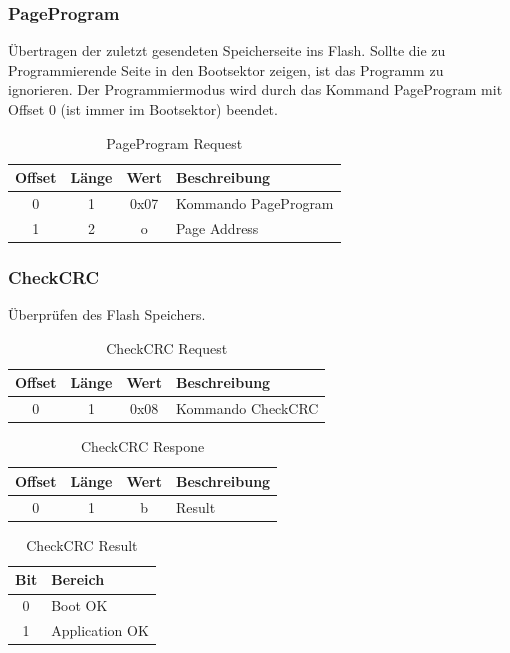 \documentclass[10pt,a4paper]{article}
\begin{document}
\subsubsection{PageProgram}
\label{sec:PageProgram}
Übertragen der zuletzt gesendeten Speicherseite ins Flash. Sollte die zu Programmierende Seite in den Bootsektor zeigen, ist das Programm zu ignorieren. Der Programmiermodus wird durch das Kommand PageProgram mit Offset 0 (ist immer im Bootsektor) beendet.
\begin{table}[H]
\centering
\begin{tabular}{c|c|c|l}
\textbf{Offset} & \textbf{Länge} & \textbf{Wert} & \textbf{Beschreibung} \\ \hline
0 & 1 & 0x07 & Kommando PageProgram\\
1 & 2 & o & Page Address
\end{tabular}
\caption{PageProgram Request}
\end{table}

\subsubsection{CheckCRC}
\label{CHECK_CRC}
\label{sec:CheckCRC}
Überprüfen des Flash Speichers.
\begin{table}[H]
\centering
\begin{tabular}{c|c|c|l}
\textbf{Offset} & \textbf{Länge} & \textbf{Wert} & \textbf{Beschreibung} \\ \hline
0 & 1 & 0x08 & Kommando CheckCRC\\
\end{tabular}
\caption{CheckCRC Request}
\end{table}
\begin{table}[H]
\centering
\begin{tabular}{c|c|c|l}
\textbf{Offset} & \textbf{Länge} & \textbf{Wert} & \textbf{Beschreibung} \\ \hline
0 & 1 & b & Result\\
\end{tabular}
\caption{CheckCRC Respone}
\end{table}
\begin{table}[H]
\centering
\begin{tabular}{c|l}
\textbf{Bit} & \textbf{Bereich} \\ \hline
0 & Boot OK\\
1 & Application OK\\
\end{tabular}
\caption{CheckCRC Result}
\end{table}
\end{document}
